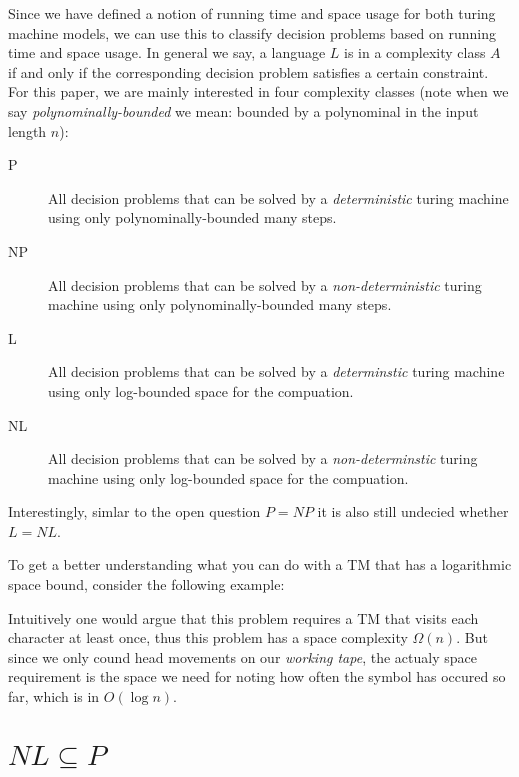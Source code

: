 Since we have defined a notion of running time and space usage for both
turing machine models, we can use this to classify decision problems
based on running time and space usage. In general we say, a language $L$
is in a complexity class $A$ if and only if the corresponding decision
problem satisfies a certain constraint. For this paper, we are mainly
interested in four complexity classes (note when we say
\emph{polynominally-bounded} we mean: bounded by a polynominal in the
input length $n$):

\begin{description}
\item[P]
All decision problems that can be solved by a \emph{deterministic}
turing machine using only polynominally-bounded many steps.
\item[NP]
All decision problems that can be solved by a \emph{non-deterministic}
turing machine using only polynominally-bounded many steps.
\item[L]
All decision problems that can be solved by a \emph{determinstic} turing
machine using only log-bounded space for the compuation.
\item[NL]
All decision problems that can be solved by a \emph{non-determinstic}
turing machine using only log-bounded space for the compuation.
\end{description}

Interestingly, simlar to the open question $P = NP$ it is also still
undecied whether $L = NL$.

To get a better understanding what you can do with a TM that has a
logarithmic space bound, consider the following example:

\begin{description}
\itemsep1pt\parskip0pt
\item[Writing down all occurences of a symbol in the input]
Intuitively one would argue that this problem requires a TM that visits
each character at least once, thus this problem has a space complexity
$\Omega (n)$. But since we only cound head movements on our
\emph{working tape}, the actualy space requirement is the space we need
for noting how often the symbol has occured so far, which is in
$O(\log n)$.
\end{description}

\section{$NL \subseteq P$}\label{nl-subseteq-p}

